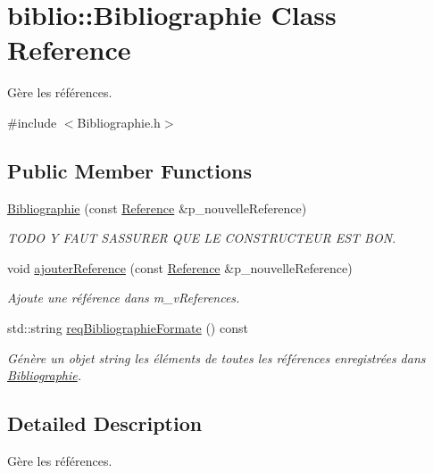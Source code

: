 \hypertarget{classbiblio_1_1Bibliographie}{}\section{biblio\+:\+:Bibliographie Class Reference}
\label{classbiblio_1_1Bibliographie}


Gère les références.  




{\ttfamily \#include $<$Bibliographie.\+h$>$}

\subsection*{Public Member Functions}
\begin{DoxyCompactItemize}
\item 
\hyperlink{classbiblio_1_1Bibliographie_a41550239d35963ee03672d52ba4e5973}{Bibliographie} (const \hyperlink{classbiblio_1_1Reference}{Reference} \&p\+\_\+nouvelle\+Reference)
\begin{DoxyCompactList}\small\item\em T\+O\+DO Y F\+A\+UT S\+A\+S\+S\+U\+R\+ER Q\+UE LE C\+O\+N\+S\+T\+R\+U\+C\+T\+E\+UR E\+ST B\+ON. \end{DoxyCompactList}\item 
void \hyperlink{classbiblio_1_1Bibliographie_aa873f6c1a158c807072f91f3a5b33947}{ajouter\+Reference} (const \hyperlink{classbiblio_1_1Reference}{Reference} \&p\+\_\+nouvelle\+Reference)
\begin{DoxyCompactList}\small\item\em Ajoute une référence dans m\+\_\+v\+References. \end{DoxyCompactList}\item 
std\+::string \hyperlink{classbiblio_1_1Bibliographie_a651e6318bc607af6c3e42f5ce28d66fd}{req\+Bibliographie\+Formate} () const
\begin{DoxyCompactList}\small\item\em Génère un objet string les éléments de toutes les références enregistrées dans \hyperlink{classbiblio_1_1Bibliographie}{Bibliographie}. \end{DoxyCompactList}\end{DoxyCompactItemize}


\subsection{Detailed Description}
Gère les références. 

